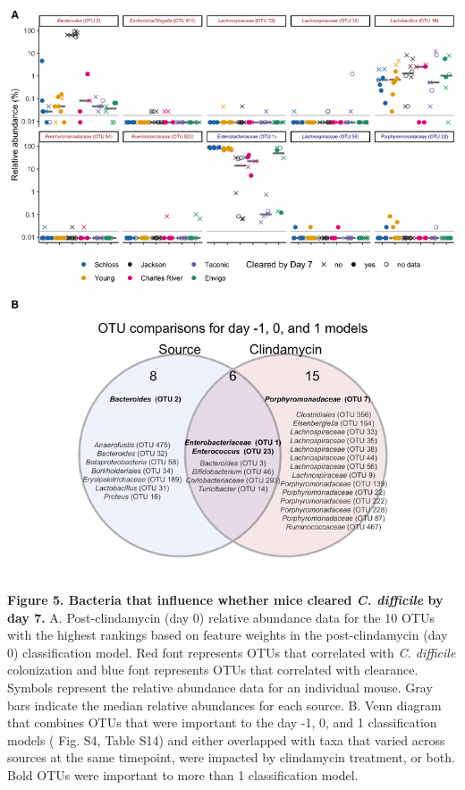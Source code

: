 \documentclass[
  11pt,
]{article}
\begin{document}
\newpage

\includegraphics{figure_5.pdf} \textbf{Figure 5. Bacteria that influence
whether mice cleared \emph{C. difficile} by day 7.} A. Post-clindamycin
(day 0) relative abundance data for the 10 OTUs with the highest
rankings based on feature weights in the post-clindamycin (day 0)
classification model. Red font represents OTUs that correlated with
\emph{C. difficile} colonization and blue font represents OTUs that
correlated with clearance. Symbols represent the relative abundance data
for an individual mouse. Gray bars indicate the median relative
abundances for each source. B. Venn diagram that combines OTUs that were
important to the day -1, 0, and 1 classification models ( Fig. S4, Table
S14) and either overlapped with taxa that varied across sources at the
same timepoint, were impacted by clindamycin treatment, or both. Bold
OTUs were important to more than 1 classification model.

\newpage
\end{document}
